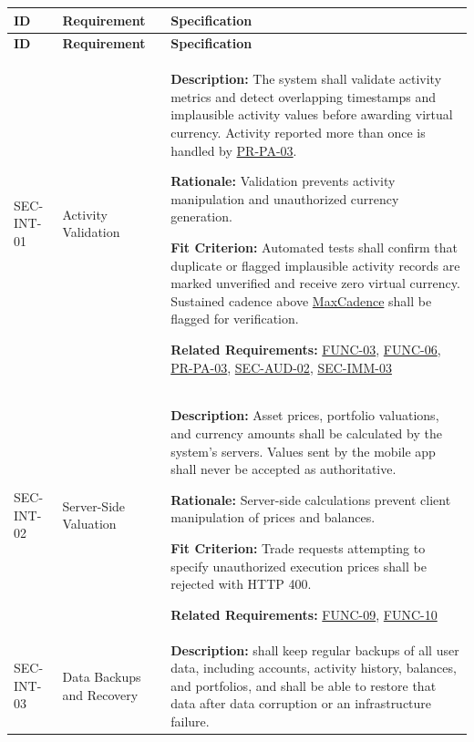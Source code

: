 \documentclass[12pt]{article}
\newcommand{\const}[1]{\hyperlink{const:#1}{\textsf{#1}}}
\begin{document}
\small
\setlength{\tabcolsep}{4pt}
\begin{xltabular}{\textwidth}{|p{2.6cm}|p{3.4cm}|X|}
\hline
\textbf{ID} & \textbf{Requirement} & \textbf{Specification} \\
\hline
\endfirsthead
\hline
\textbf{ID} & \textbf{Requirement} & \textbf{Specification} \\
\hline
\endhead

SEC-INT-01\hypertarget{req:SEC-INT-01}{} &
Activity Validation &
\textbf{Description:} The system shall validate activity metrics and detect overlapping timestamps and implausible activity values before awarding virtual currency. Activity reported more than once is handled by \hyperlink{req:PR-PA-03}{PR-PA-03}.

\textbf{Rationale:} Validation prevents activity manipulation and unauthorized currency generation.

\textbf{Fit Criterion:} Automated tests shall confirm that duplicate or flagged implausible activity records are marked unverified and receive zero virtual currency. Sustained cadence above \const{MaxCadence} shall be flagged for verification. 

\textbf{Related Requirements:} \hyperlink{req:FUNC-03}{FUNC-03}, \hyperlink{req:FUNC-06}{FUNC-06}, \hyperlink{req:PR-PA-03}{PR-PA-03}, \hyperlink{req:SEC-AUD-02}{SEC-AUD-02}, \hyperlink{req:SEC-IMM-03}{SEC-IMM-03}\\
\hline

SEC-INT-02\hypertarget{req:SEC-INT-02}{} &
Server-Side Valuation &
\textbf{Description:} Asset prices, portfolio valuations, and currency amounts shall be calculated by the system's servers. Values sent by the mobile app shall never be accepted as authoritative.

\textbf{Rationale:} Server-side calculations prevent client manipulation of prices and balances.

\textbf{Fit Criterion:} Trade requests attempting to specify unauthorized execution prices shall be rejected with HTTP 400. 

\textbf{Related Requirements:} \hyperlink{req:FUNC-09}{FUNC-09}, \hyperlink{req:FUNC-10}{FUNC-10}\\
\hline

SEC-INT-03\hypertarget{req:SEC-INT-03}{} &
Data Backups and Recovery &
\textbf{Description:} \progname{} shall keep regular backups of all user data, including accounts, activity history, balances, and portfolios, and shall be able to restore that data after data corruption or an infrastructure failure.


\end{xltabular}
\end{document}
